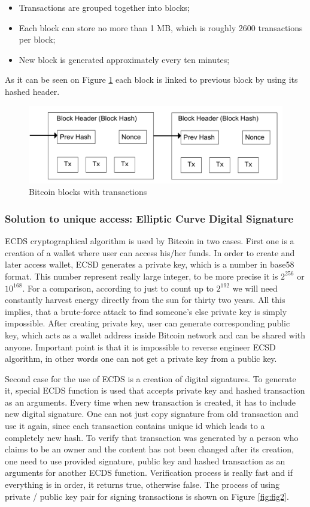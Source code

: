 \documentclass[conference,compsoc]{IEEEtran}
\begin{document}
\begin{itemize}
  \item Transactions are grouped together into blocks; 
  \item Each block can store no more than 1 MB, which is roughly 2600 transactions per block;
  \item New block is generated approximately every ten minutes;
\end{itemize}

As it can be seen on Figure \ref{fig:fig1} each block is linked to previous block by using its hashed header. 

\begin{figure}[h!]
  \centering
  \includegraphics[width=.45\textwidth]{graphics/blocks.png}
  \caption{Bitcoin blocks with transactions}
  \label{fig:fig1}
\end{figure}


\subsubsection{Solution to unique access: Elliptic Curve Digital Signature}
ECDS cryptographical algorithm is used by Bitcoin in two cases. 
First one is a creation of a wallet where user can access his/her funds.
In order to create and later access wallet, ECSD generates a private key, which is a number in base58 format. This number represent really large integer, to be more precise it is $2^{256}$ or $10^{168}$. 
For a comparison, according to \cite{cryptography} just to count up to $2^{192}$ we will need constantly harvest energy directly from the sun for thirty two years. 
All this implies, that a brute-force attack to find someone's else private key is simply impossible. 
After creating private key, user can generate corresponding public key, which acts as a wallet address inside Bitcoin network and can be shared with anyone. 
Important point is that it is impossible to reverse engineer ECSD algorithm, in other words one can not get a private key from a public key.

Second case for the use of ECDS is a creation of digital signatures.
To generate it, special ECDS function is used that accepts private key and hashed transaction as an arguments. 
Every time when new transaction is created, it has to include new digital signature.
One can not just copy signature from old transaction and use it again, since each transaction contains unique id which leads to a completely new hash.  
To verify that transaction was generated by a person who claims to be an owner and the content has not been changed after its creation, one need to use provided signature, public key and hashed transaction as an arguments for another ECDS function. 
Verification process is really fast and if everything is in order, it returns true, otherwise false.
The process of using private / public key pair for signing transactions is shown on Figure \ref{fig:fig2}.
\end{document}
